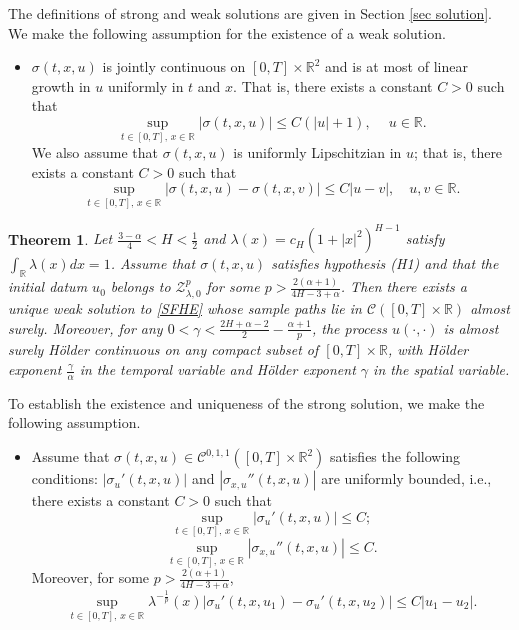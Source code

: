 \documentclass[11pt,reqno]{amsart}
\numberwithin{equation}{section}
\newtheorem{theorem}{Theorem}[section]
\newcommand{\1}{{\bf 1}}
\newcommand{\2}{{\bf 2}}
\begin{document}
 
The definitions of strong and weak solutions are given in Section \ref{sec solution}.  We make the following assumption for the existence      of a weak solution.
\begin{itemize}
\item[(H1)] $\sigma(t,x,u)$ is jointly continuous on $[0,T]\times \mathbb{R}^2$ and is at most of linear growth in $u$ uniformly in $t$ and $x$. That is, there exists a constant $C>0$ such that
\begin{equation}\label{eq sigma 1}
\sup_{t\in[0,T],\, x\in\mathbb{R}}\left|\sigma(t,x,u)\right|\le C(|u|+1),  \quad \ u\in \mathbb R. 
\end{equation}
  We also assume that $\sigma(t, x, u)$ is uniformly Lipschitzian  in $u$; that is,  there exists a constant $C>0$ such that  
 \begin{equation}\label{eq sigma 2}
\sup_{t\in[0,T],\, x\in\mathbb{R}}\left|\sigma(t,x,u)-\sigma(t,x,v)\right|\le C|u-v|, \quad u,v\in\mathbb{R}.
\end{equation}
  \end{itemize}
 
\begin{theorem}\label{thm main1}
Let $ \frac{3-\alpha}{4}<H<\frac 12$ and  $\lambda(x)=c_H(1+|x|^2)^{H-1}$ satisfy $\int_{\mathbb{R}}\lambda(x)dx=1$.  Assume that $\sigma(t,x,u)$ satisfies hypothesis (H1) and that the  initial datum $u_0$ belongs to $\mathcal{Z}_{\lambda,0}^p$ for some $p>\frac{2(\alpha+1)}{4H-3+\alpha}$.
  Then there exists a unique weak solution to \eqref{SFHE} whose sample paths lie in $\mathcal{C}([0,T]\times\mathbb{R})$ almost surely. Moreover, for any $0<\gamma<\frac{2H+\alpha-2}{2}-\frac{\alpha+1}{p}$, the process $u(\cdot,\cdot)$ is almost surely H\"older continuous on any compact subset  of $[0,T]\times\mathbb{R}$, with  H\"older exponent $\frac{\gamma}{\alpha}$ in the temporal variable  and H\"older exponent $\gamma$ in the spatial variable.
\end{theorem}

To establish the   existence and uniqueness of the strong solution, we make the following assumption.
\begin{itemize}
\item[(H2)]  Assume that $\sigma(t,x,u)\in \mathcal{C}^{0,1,1}([0,T]\times\mathbb{R}^2)$ satisfies the following conditions: $\left|\sigma_u'(t,x,u)\right|$ and $\left|\sigma_{x,u}''(t, x, u)\right|$ are uniformly bounded, i.e., there exists a constant $C>0$ such that
\begin{equation}\label{eq sigma 3}
\sup_{t\in[0,T],\, x\in\mathbb{R}}\left|\sigma_u'(t, x, u)\right|\le C;
\end{equation}
\begin{equation}\label{eq sigma 4}
\sup_{t\in[0,T],\, x\in\mathbb{R}}\left|\sigma_{x, u}''(t, x, u)\right|\le C.
\end{equation}
 Moreover, for some $p>\frac{2(\alpha+1)}{4H-3+\alpha}$,
 \begin{equation}\label{eq sigma 5}
\sup_{t\in[0,T],\, x\in\mathbb{R}}\lambda^{-\frac1p}(x)\left|\sigma_u'(t,x,u_1)-\sigma_u'(t,x,u_2)\right|\le C|u_1-u_2|.
\end{equation}
\end{itemize}
\end{document}
